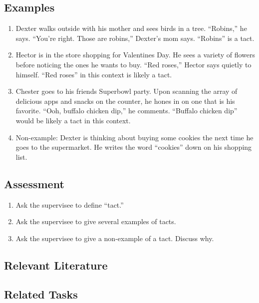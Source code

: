 \subsection{Examples}
\begin{enumerate}
\item Dexter walks outside with his mother and sees birds in a tree.  ``Robins,'' he says.  ``You're right. Those are robins,'' Dexter's mom says. ``Robins'' is a tact.
\item Hector is in the store shopping for Valentines Day.  He sees a variety of flowers before noticing the ones he wants to buy.  ``Red roses,'' Hector says quietly to himself. ``Red roses'' in this context is likely a tact. 
\item Chester goes to his friends Superbowl party.  Upon scanning the array of delicious apps and snacks on the counter, he hones in on one that is his favorite.  ``Ooh, buffalo chicken dip,'' he comments.  ``Buffalo chicken dip'' would be likely a tact in this context.
\item Non-example: Dexter is thinking about buying some cookies the next time he goes to the supermarket.  He writes the word ``cookies'' down on his shopping list. 
%
\end{enumerate}
%
\subsection{Assessment}
\begin{enumerate}
\item Ask the supervisee to define ``tact.''  
\item Ask the supervisee to give several examples of tacts.
\item Ask the supervisee to give a non-example of a tact. Discuss why.
%
\end{enumerate}
%
\subsection{Relevant Literature}
\begin{refsection}
\nocite{cooper2007applied,
        skinner1957verbal}
\printbibliography[heading=none]
\end{refsection}
%
\subsection{Related Tasks}
\fourdTwelve{}\\
%
\clearpage \section{\fourFKFourtySix{}}
